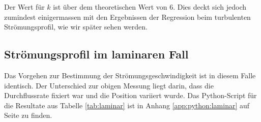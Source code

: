 Der   Wert    f\"ur   $k$    ist   \"uber    dem   theoretischen    Wert   von
\num{6}\footnotemark[5]. Dies  deckt sich  jedoch zumindest  einigermassen mit
den  Ergebnissen der  Regression beim  turbulenten Str\"omungsprofil,  wie wir
sp\"ater sehen werden.



\clearpage
\subsection{Str\"omungsprofil im laminaren Fall}
\label{subsec:profil:laminar}

Das  Vorgehen  zur Bestimmung  der  Str\"omungsgeschwindigkeit  ist in  diesem
Falle  identisch. Der  Unterschied  zur   obigen  Messung  liegt  darin,  dass
die  Durchflussrate   fixiert  war   und  die  Position   variiert  wurde. Das
Python-Script f\"ur die Resultate aus  Tabelle \ref{tab:laminar} ist in Anhang
\ref{app:python:laminar} auf Seite \pageref{app:python:laminar} zu finden.

